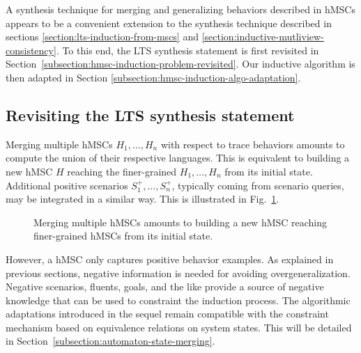 A synthesis technique for merging and generalizing behaviors described in hMSCs appears to be a convenient extension to the synthesis technique described in sections \ref{section:lts-induction-from-mscs} and \ref{section:inductive-mutliview-consistency}. To this end, the LTS synthesis statement is first revisited in Section~\ref{subsection:hmsc-induction-problem-revisited}. Our inductive algorithm is then adapted in Section \ref{subsection:hmsc-induction-algo-adaptation}.

\subsection{Revisiting the LTS synthesis statement\label{subsection:hmsc-induction-problem-revisited}}

Merging multiple hMSCs $H_1,\ldots,H_n$ with respect to trace behaviors amounts to compute the union of their respective languages. This is equivalent to building a new hMSC $H$ reaching the finer-grained $H_1,\ldots,H_n$ from its initial state. Additional positive scenarios $S^+_1,\ldots,S^+_n$, typically coming from scenario queries, may be integrated in a similar way. This is illustrated in Fig.~\ref{figure:multiple-hmscs}.

\begin{figure}\centering
{}
\caption{Merging multiple hMSCs amounts to building a new hMSC reaching finer-grained hMSCs from its initial state.\label{figure:multiple-hmscs}} 
\end{figure}

However, a hMSC only captures positive behavior examples. As explained in previous sections, negative information is needed for avoiding overgeneralization. Negative scenarios, fluents, goals, and the like provide a source of negative knowledge that can be used to constraint the induction process. The algorithmic adaptations introduced in the sequel remain compatible with the constraint mechanism based on equivalence relations on system states. This will be detailed in Section~\ref{subsection:automaton-state-merging}.

